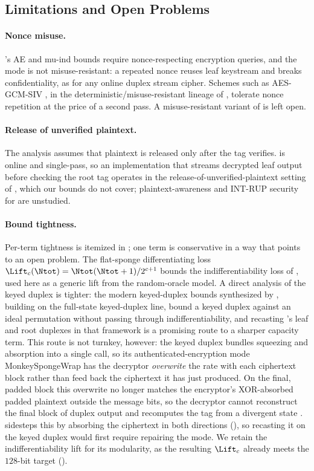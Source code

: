 \subsection{Limitations and Open Problems}
\label{sec:limitations}

\paragraph{Nonce misuse.}
\TW{}'s AE and mu-ind bounds require nonce-respecting encryption queries, and the mode is
not misuse-resistant: a repeated nonce reuses leaf keystream and breaks
confidentiality, as for any online duplex stream cipher. Schemes such as
AES-GCM-SIV \cite{GLL17}, in the deterministic/misuse-resistant lineage of
\cite{RS06}, tolerate nonce repetition at the price of a second pass. A
misuse-resistant variant of \TW{} is left open.

\paragraph{Release of unverified plaintext.}
The analysis assumes that plaintext is released only after the tag verifies. \TW{}
is online and single-pass, so an implementation that streams decrypted leaf
output before checking the root tag operates in the release-of-unverified-plaintext
setting of \cite{ABLMMY14}, which our bounds do not cover; plaintext-awareness and
\textsf{INT-RUP} security for \TW{} are unstudied.

\paragraph{Bound tightness.}
Per-term tightness is itemized in ; one term is
conservative in a way that points to an open problem. The flat-sponge
differentiating loss
$\Lift_c(\Ntot) = \Ntot(\Ntot+1)/2^{c+1}$ bounds the indifferentiability
loss of \cite{BDPV08}, used here as a generic lift from the
random-oracle model. A direct analysis of the keyed duplex is tighter: the
modern keyed-duplex bounds synthesized by \cite{Men23}, building on the
full-state keyed-duplex line, bound a keyed duplex against an ideal permutation
without passing through indifferentiability, and recasting \TW{}'s leaf and root
duplexes in that framework is a promising route to a sharper capacity term. This
route is not turnkey, however: the keyed duplex bundles squeezing and absorption
into a single call, so its authenticated-encryption mode \textsf{MonkeySpongeWrap}
has the decryptor \emph{overwrite} the rate with each ciphertext block rather than
feed back the ciphertext it has just produced. On the final, padded block this
overwrite no longer matches the encryptor's XOR-absorbed padded plaintext outside
the message bits, so the decryptor cannot reconstruct the final block of duplex
output and recomputes the tag from a divergent state \cite[Alg.~8]{Men23}. \TW{}
sidesteps this by absorbing the ciphertext in both directions (),
so recasting it on the keyed duplex would first require repairing the mode. We
retain the indifferentiability lift for its modularity, as the resulting
$\Lift_c$ already meets the $128$-bit target ().

